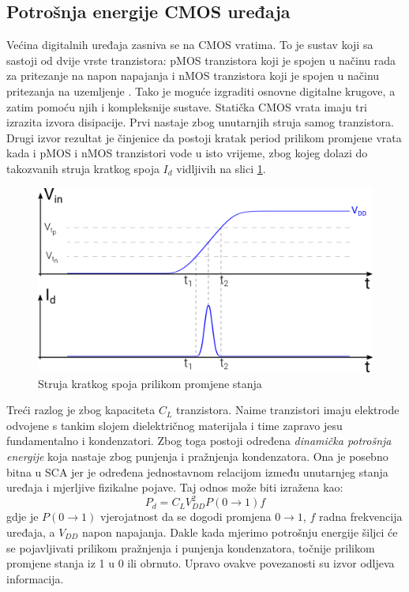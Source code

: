 \documentclass[times, utf8, diplomski]{fer}
\begin{document}
\subsection{Potrošnja energije CMOS uređaja} \label{sec:power_cmos}

Većina digitalnih uređaja zasniva se na CMOS vratima. To je sustav koji sa sastoji od dvije vrste tranzistora: pMOS tranzistora koji je spojen u načinu rada za pritezanje na napon napajanja  i nMOS tranzistora koji je spojen u načinu pritezanja na uzemljenje . Tako je moguće izgraditi osnovne digitalne krugove, a zatim pomoću njih i kompleksnije sustave. Statička CMOS vrata imaju tri izrazita izvora disipacije. Prvi nastaje zbog unutarnjih struja samog tranzistora. Drugi izvor rezultat je činjenice da postoji kratak period prilikom promjene vrata kada i pMOS i nMOS tranzistori vode u isto vrijeme, zbog kojeg dolazi do takozvanih struja kratkog spoja \(I_d\) vidljivih na slici \ref{fig:short_circuit_current}.

\begin{figure}[htb]
    \centering
    \includegraphics[width=12cm]{resources/images/SCA/short_circuit_current.png}
    \caption{Struja kratkog spoja prilikom promjene stanja}
    \label{fig:short_circuit_current}
\end{figure}

Treći razlog je zbog kapaciteta \(C_L\) tranzistora. Naime tranzistori imaju elektrode odvojene s tankim slojem dielektričnog materijala i time zapravo jesu fundamentalno i kondenzatori. Zbog toga postoji određena \emph{dinamička potrošnja energije} koja nastaje zbog punjenja i pražnjenja kondenzatora. Ona je posebno bitna u SCA jer je određena jednostavnom relacijom između unutarnjeg stanja uređaja i mjerljive fizikalne pojave. Taj odnos može biti izražena kao:
\begin{equation}
    P_d = C_L V_{DD}^2 P(0 \rightarrow 1) f
\end{equation}
gdje je \(P(0 \rightarrow 1)\) vjerojatnost da se dogodi promjena \(0 \rightarrow 1\), \(f\) radna frekvencija uređaja, a \(V_{DD}\) napon napajanja. Dakle kada mjerimo potrošnju energije šiljci će se pojavljivati prilikom pražnjenja i punjenja kondenzatora, točnije prilikom promjene stanja iz 1 u 0 ili obrnuto. Upravo ovakve povezanosti su izvor odljeva informacija.
\end{document}

